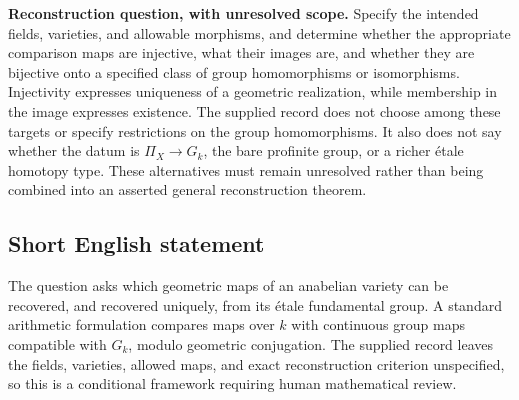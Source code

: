 \documentclass[11pt]{article}
\begin{document}
\textbf{Reconstruction question, with unresolved scope.} Specify the intended fields, varieties, and allowable morphisms, and determine whether the appropriate comparison maps are injective, what their images are, and whether they are bijective onto a specified class of group homomorphisms or isomorphisms. Injectivity expresses uniqueness of a geometric realization, while membership in the image expresses existence. The supplied record does not choose among these targets or specify restrictions on the group homomorphisms. It also does not say whether the datum is \(\Pi_X\to G_k\), the bare profinite group, or a richer étale homotopy type. These alternatives must remain unresolved rather than being combined into an asserted general reconstruction theorem.
\subsection{Short English statement}
The question asks which geometric maps of an anabelian variety can be recovered, and recovered uniquely, from its étale fundamental group. A standard arithmetic formulation compares maps over \(k\) with continuous group maps compatible with \(G_k\), modulo geometric conjugation. The supplied record leaves the fields, varieties, allowed maps, and exact reconstruction criterion unspecified, so this is a conditional framework requiring human mathematical review.
\end{document}
